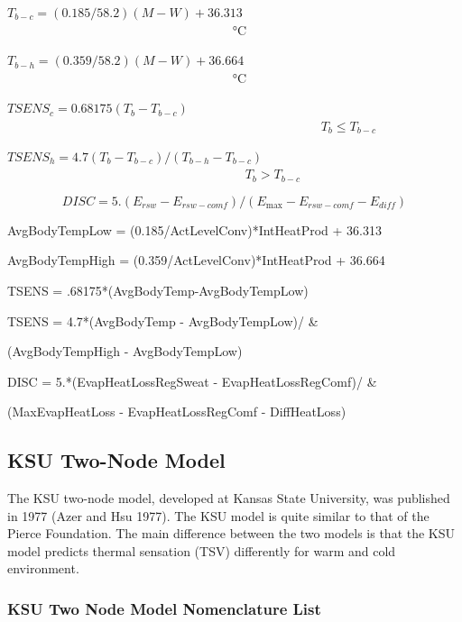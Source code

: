 \({T_{b - c}} = (0.185/58.2)(M - W) + 36.313\) ~~~~~~~~~~~~~~~~~~~~~~~~~~~~~~~~~~~ °C

\({T_{b - h}} = (0.359/58.2)(M - W) + 36.664\) ~~~~~~~~~~~~~~~~~~~~~~~~~~~~~~~~~~~ °C

\(TSEN{S_c} = 0.68175({T_b} - {T_{b - c}})\) ~~~~~~~~~~~~~~~~~~~~~~~~~~~~~~~~~~~~~~~~~~~~~~~~~ \({T_b} \le {T_{b - c}}\)

\(TSEN{S_h} = 4.7({T_b} - {T_{b - c}})/({T_{b - h}} - {T_{b - c}})\) ~~~~~~~~~~~~~~~~~~~~~~~~~~~~~~~~~~~~~ \({T_b} > {T_{b - c}}\)

\begin{equation}
DISC = 5.({E_{rsw}} - {E_{rsw - comf}})/({E_{\max }} - {E_{rsw - comf}} - {E_{diff}})
\end{equation}

AvgBodyTempLow = (0.185/ActLevelConv)*IntHeatProd + 36.313

AvgBodyTempHigh = (0.359/ActLevelConv)*IntHeatProd + 36.664

TSENS = .68175*(AvgBodyTemp-AvgBodyTempLow)

TSENS = 4.7*(AvgBodyTemp - AvgBodyTempLow)/ \&

(AvgBodyTempHigh - AvgBodyTempLow)

DISC = 5.*(EvapHeatLossRegSweat - EvapHeatLossRegComf)/ \&

(MaxEvapHeatLoss - EvapHeatLossRegComf - DiffHeatLoss)

\subsection{KSU Two-Node Model}\label{ksu-two-node-model}

The KSU two-node model, developed at Kansas State University, was published in 1977 (Azer and Hsu 1977). The KSU model is quite similar to that of the Pierce Foundation. The main difference between the two models is that the KSU model predicts thermal sensation (TSV) differently for warm and cold environment.

\subsubsection{KSU Two Node Model Nomenclature List}\label{ksu-two-node-model-nomenclature-list}


